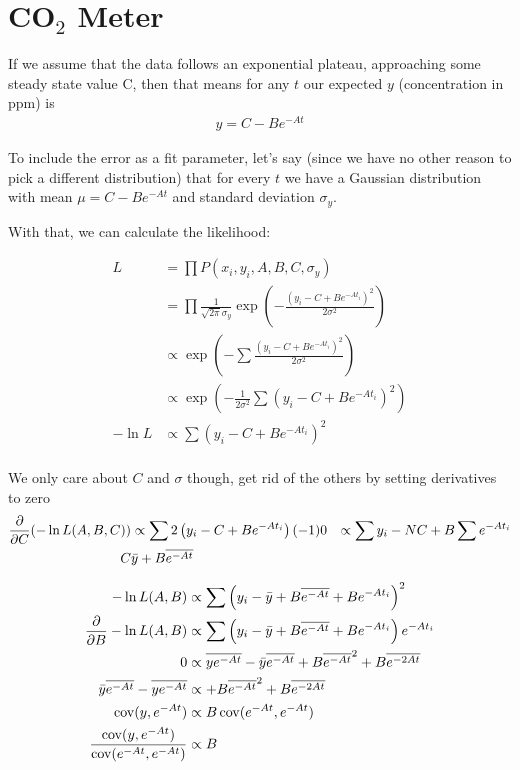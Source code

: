 \section{\texorpdfstring{CO$_2$}{CO2} Meter}

If we assume that the data follows an exponential plateau, approaching some steady state value C, then that means for any $t$ our expected $y$ (concentration in ppm) is
\begin{align*}
    y = C - B e^{-At}
\end{align*}

To include the error as a fit parameter, let's say (since we have no other reason to pick a different distribution) that for every $t$ we have a Gaussian distribution with mean $\mu = C - B e^{-At}$ and standard deviation $\sigma_y$.

With that, we can calculate the likelihood:

\begin{align*}
    L &= \prod P(x_i, y_i, A, B, C, \sigma_y) \\
    &= \prod \frac{1}{\sqrt{2\pi}\sigma_y}\exp\left(-\frac{\left(y_i - C + B e^{-At_i}\right)^2}{2\sigma^2}\right) \\
    &\propto \exp\left(-\sum \frac{\left(y_i - C + B e^{-At_i}\right)^2}{2\sigma^2}\right) \\
    &\propto \exp\left(-\frac{1}{2\sigma^2}\sum \left(y_i - C + B e^{-At_i}\right)^2\right) \\
    -\ln L &\propto \sum \left(y_i - C + B e^{-At_i}\right)^2 \\
\end{align*}

We only care about $C$ and $\sigma$ though, get rid of the others by setting derivatives to zero
\begin{align*}
    \frac{\partial}{\partial C}(-\ln L(A,B,C)) &\propto \sum 2\left(y_i - C + B e^{-At_i}\right)(-1)
    0 &\propto \sum y_i - N C + B \sum e^{-At_i} \\
    C & \bar{y} + B \overline{e^{-At}} \\
\end{align*}

\begin{align*}
    -\ln L(A,B) &\propto \sum \left(y_i - \bar{y} + B \overline{e^{-At}} + B e^{-At_i}\right)^2 \\
    \frac{\partial}{\partial B}-\ln L(A,B) &\propto \sum \left(y_i - \bar{y} + B \overline{e^{-At}} + B e^{-At_i}\right)e^{-At_i} \\
    0 &\propto \overline{y e^{-At}} - \bar{y}\overline{e^{-At}} + B \overline{e^{-At}}^2 + B \overline{e^{-2At}} \\
    \bar{y}\overline{e^{-At}} - \overline{y e^{-At}} &\propto  + B \overline{e^{-At}}^2 + B \overline{e^{-2At}} \\
    \operatorname{cov}(y, e^{-At}) &\propto B \operatorname{cov}(e^{-At}, e^{-At}) \\
    \frac{\operatorname{cov}(y, e^{-At})}{\operatorname{cov}(e^{-At}, e^{-At})} &\propto B  \\
\end{align*}


